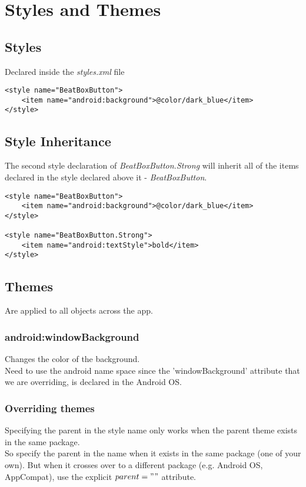 \documentclass[]{article}
\begin{document}
\section{Styles and Themes}
\subsection{Styles}
Declared inside the \textit{styles.xml} file
\begin{lstlisting}
<style name="BeatBoxButton">
	<item name="android:background">@color/dark_blue</item>
</style>
\end{lstlisting}

\subsection{Style Inheritance}
The second style declaration of \textit{BeatBoxButton.Strong} will inherit all of the items declared in the style declared above it - \textit{BeatBoxButton}.
\begin{lstlisting}
<style name="BeatBoxButton">
	<item name="android:background">@color/dark_blue</item>
</style>

<style name="BeatBoxButton.Strong">
	<item name="android:textStyle">bold</item>
</style>
\end{lstlisting}

\subsection{Themes}
Are applied to all objects across the app.

\subsubsection{android:windowBackground}
Changes the color of the background.
\\
Need to use the android name space since the 'windowBackground' attribute that we are overriding, is declared in the Android OS.

\subsubsection{Overriding themes}
Specifying the parent in the style name only works when the parent theme exists in the same package.
\\
So specify the parent in the name when it exists in the same package (one of your own).  But when it crosses over to a different package (e.g. Android OS, AppCompat), use the explicit $ parent="" $ attribute.
\end{document}
